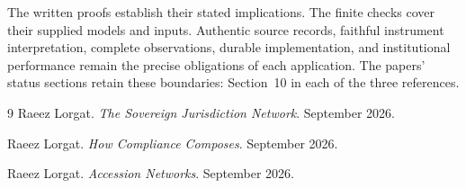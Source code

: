 \documentclass{momentum}
\begin{document}
The written proofs establish their stated implications.
The finite checks cover their supplied models and inputs.
Authentic source records, faithful instrument interpretation, complete observations, durable implementation, and institutional performance remain the precise obligations of each application.
The papers' status sections retain these boundaries: Section~10 in each of the three references.

\begin{thebibliography}{9}
Raeez Lorgat.
\emph{The Sovereign Jurisdiction Network}.
September 2026.

Raeez Lorgat.
\emph{How Compliance Composes}.
September 2026.

Raeez Lorgat.
\emph{Accession Networks}.
September 2026.
\end{thebibliography}
\end{document}
